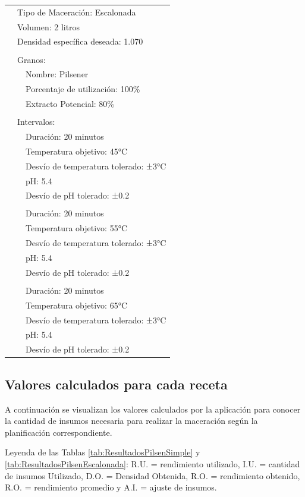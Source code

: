 \begin{longtable}{p{0.6cm} p{0.6cm} p{12.8cm}}
        & \multicolumn{2}{l}{Tipo de Maceración: Escalonada} \\
        & \multicolumn{2}{l}{Volumen: 2 litros}  \\
        & \multicolumn{2}{l}{Densidad específica deseada: 1.070} \\
        & & \\
        & \multicolumn{2}{l}{Granos:} \\
        & & Nombre: Pilsener \\
        & & Porcentaje de utilización: 100\% \\
        & & Extracto Potencial: 80\% \\
        & & \\
        & \multicolumn{2}{l}{Intervalos:} \\
        & & Duración: 20 minutos \\
        & & Temperatura objetivo: 45°C \\
        & & Desvío de temperatura tolerado: ±3°C \\
        & & pH: 5.4 \\
        & & Desvío de pH tolerado: ±0.2 \\
        & & \\
        & & Duración: 20 minutos \\
        & & Temperatura objetivo: 55°C \\
        & & Desvío de temperatura tolerado: ±3°C \\
        & & pH: 5.4 \\
        & & Desvío de pH tolerado: ±0.2 \\
        & & \\
        & & Duración: 20 minutos \\
        & & Temperatura objetivo: 65°C \\
        & & Desvío de temperatura tolerado: ±3°C \\
        & & pH: 5.4 \\
        & & Desvío de pH tolerado: ±0.2 \\

        \end{longtable}
    
    \subsection{Valores calculados para cada receta}
    \par A continuación se visualizan los valores calculados por la aplicación para conocer la cantidad de insumos necesaria para realizar la maceración según la planificación correspondiente.
    \par Leyenda de las Tablas \ref{tab:ResultadosPilsenSimple} y \ref{tab:ResultadosPilsenEscalonada}: R.U. = rendimiento utilizado, I.U. = cantidad de insumos Utilizado, D.O. = Densidad Obtenida, R.O. = rendimiento obtenido, R.O. = rendimiento promedio y A.I. = ajuste de insumos.
    
